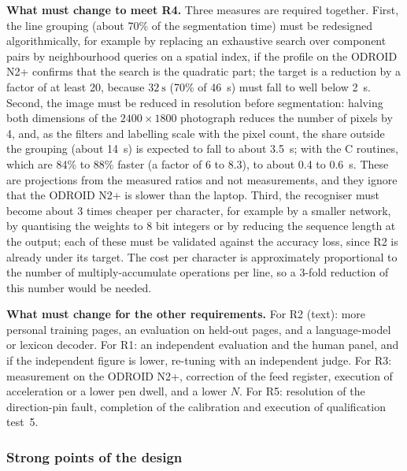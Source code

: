         \textbf{What must change to meet R4.}
        Three measures are required together.
        First, the line grouping (about 70\% of the segmentation time) must be redesigned algorithmically, for example by replacing an exhaustive search over component pairs by neighbourhood queries on a spatial index, if the profile on the ODROID N2+ confirms that the search is the quadratic part; the target is a reduction by a factor of at least 20, because $32~\mathrm{s}$ (70\% of 46~s) must fall to well below 2~s.
        Second, the image must be reduced in resolution before segmentation: halving both dimensions of the $2400\times1800$ photograph reduces the number of pixels by 4, and, as the filters and labelling scale with the pixel count, the share outside the grouping (about 14~s) is expected to fall to about 3.5~s; with the C routines, which are 84\% to 88\% faster (a factor of 6 to 8.3), to about 0.4 to 0.6~s.
        These are projections from the measured ratios and not measurements, and they ignore that the ODROID N2+ is slower than the laptop.
        Third, the recogniser must become about 3 times cheaper per character, for example by a smaller network, by quantising the weights to 8 bit integers or by reducing the sequence length at the output; each of these must be validated against the accuracy loss, since R2 is already under its target.
        The cost per character is approximately proportional to the number of multiply-accumulate operations per line, so a 3-fold reduction of this number would be needed.

        \textbf{What must change for the other requirements.}
        For R2 (text): more personal training pages, an evaluation on held-out pages, and a language-model or lexicon decoder.
        For R1: an independent evaluation and the human panel, and if the independent figure is lower, re-tuning with an independent judge.
        For R3: measurement on the ODROID N2+, correction of the feed register, execution of acceleration or a lower pen dwell, and a lower $N$.
        For R5: resolution of the direction-pin fault, completion of the calibration and execution of qualification test~5.

    \subsubsection{Strong points of the design}
    \label{sec:dis-strong}

